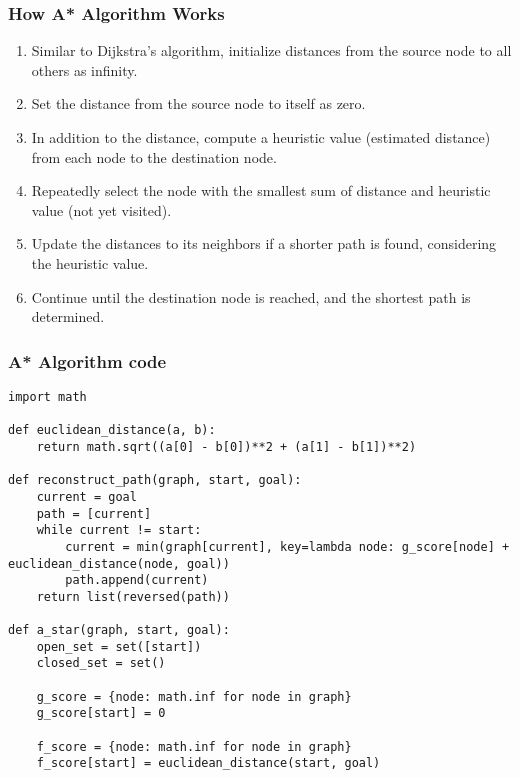 \begin{frame}[fragile]\frametitle{How A* Algorithm Works}
\begin{enumerate}
\item Similar to Dijkstra's algorithm, initialize distances from the source node to all others as infinity.
\item Set the distance from the source node to itself as zero.
\item In addition to the distance, compute a heuristic value (estimated distance) from each node to the destination node.
\item Repeatedly select the node with the smallest sum of distance and heuristic value (not yet visited).
\item Update the distances to its neighbors if a shorter path is found, considering the heuristic value.
\item Continue until the destination node is reached, and the shortest path is determined.
\end{enumerate}
\end{frame}

\begin{frame}[fragile]\frametitle{A* Algorithm code}
{\tiny
\begin{lstlisting}
import math

def euclidean_distance(a, b):
    return math.sqrt((a[0] - b[0])**2 + (a[1] - b[1])**2)

def reconstruct_path(graph, start, goal):
    current = goal
    path = [current]
    while current != start:
        current = min(graph[current], key=lambda node: g_score[node] + euclidean_distance(node, goal))
        path.append(current)
    return list(reversed(path))
	
def a_star(graph, start, goal):
    open_set = set([start])
    closed_set = set()
    
    g_score = {node: math.inf for node in graph}
    g_score[start] = 0
    
    f_score = {node: math.inf for node in graph}
    f_score[start] = euclidean_distance(start, goal)
	
\end{lstlisting}
}
\end{frame}


